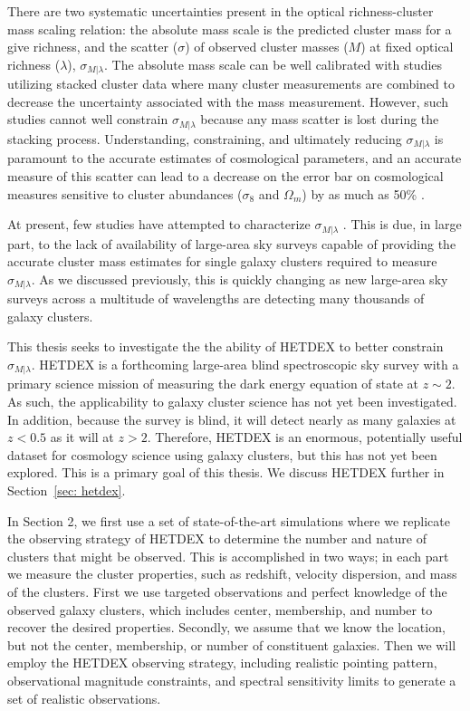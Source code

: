 There are two systematic uncertainties present in the optical richness-cluster mass scaling relation: the absolute mass scale is the predicted cluster mass for a give richness, and the scatter ($\sigma$) of observed cluster masses ($M$) at fixed optical richness ($\lambda$), $\sigma_{M|\lambda}$. The absolute mass scale can be well calibrated with studies utilizing stacked cluster data  where many cluster measurements are combined to decrease the uncertainty associated with the mass measurement. However, such studies cannot well constrain $\sigma_{M|\lambda}$ because any mass scatter is lost during the stacking process. Understanding, constraining, and ultimately reducing $\sigma_{M|\lambda}$ is paramount to the accurate estimates of cosmological parameters, and an accurate measure of this scatter can lead to a decrease on the error bar on cosmological measures sensitive to cluster abundances ($\sigma_8$ and $\Omega_m$) by as much as 50\% \citep{Rozo2010}.

At present, few studies have attempted to characterize $\sigma_{M|\lambda}$ \citep{Rozo2014,Rozo2015, Saro2015, Rykoff2016}. This is due, in large part, to the lack of availability of large-area sky surveys capable of providing the accurate cluster mass estimates for single galaxy clusters required to measure $\sigma_{M|\lambda}$. As we discussed previously, this is quickly changing as new large-area sky surveys across a multitude of wavelengths are detecting many thousands of galaxy clusters. 

This thesis seeks to investigate the the ability of HETDEX to better constrain $\sigma_{M|\lambda}$. HETDEX is a forthcoming large-area blind spectroscopic sky survey with a primary science mission of measuring the dark energy equation of state at $z\sim2$. As such, the applicability to galaxy cluster science has not yet been investigated. In addition, because the survey is blind, it will detect nearly as many galaxies at $z<0.5$ as it will at $z>2.$ Therefore, HETDEX is an enormous, potentially useful dataset for cosmology science using galaxy clusters, but this has not yet been explored. This is a primary goal of this thesis. We discuss HETDEX further in Section~\ref{sec: hetdex}.

In Section 2, we first use a set of state-of-the-art simulations where we replicate the observing strategy of HETDEX to determine the number and nature of clusters that might be observed. This is accomplished in two ways; in each part we measure the cluster properties, such as redshift, velocity dispersion, and mass of the clusters. First we use targeted observations and perfect knowledge of the observed galaxy clusters, which includes center, membership, and number to recover the desired properties. Secondly, we assume that we know the location, but not the center, membership, or number of constituent galaxies. Then we will employ the HETDEX observing strategy, including realistic pointing pattern, observational magnitude constraints, and spectral sensitivity limits to generate a set of realistic observations.

